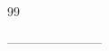 \documentclass[oneside]{amsart}
\numberwithin{equation}{section}
\numberwithin{equation}{subsection}
\theoremstyle{plain}
\theoremstyle{definition}
\begin{document}
\begin{thebibliography}{99}
% 
% 
% 
% 
% 
% 
% 
% 
% 
% 
% 
% 
% 
% 
% 
% 

-----------------------





\end{thebibliography}
\end{document}
